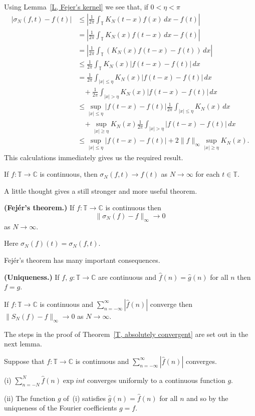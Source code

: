 Using Lemma~\ref{L, Fejer's kernel} we see that, if $0<\eta<\pi$
\begin{align*}
|\sigma_{N}(f,t)-f(t)|&\leq
\left|\frac{1}{2\pi}\int_{\mathbb T}K_{N}(t-x)f(x)\,dx-f(t)\right|\\
&=\left|\frac{1}{2\pi}\int_{\mathbb T}K_{N}(x)f(t-x)\,dx-f(t)\right|\\
&=\left|\frac{1}{2\pi}\int_{\mathbb T}(K_{N}(x)f(t-x)-f(t))\,dx\right|\\
&\leq\frac{1}{2\pi}\int_{\mathbb T}K_{N}(x)|f(t-x)-f(t)|\,dx\\
&=\frac{1}{2\pi}\int_{|x|\leq\eta}K_{N}(x)|f(t-x)-f(t)|\,dx\\
&\ \ \
\ +\frac{1}{2\pi}\int_{|x|>\eta}K_{N}(x)|f(t-x)-f(t)|\,dx\\
&\leq\sup_{|x|\leq\eta}|f(t-x)-f(t)|
\frac{1}{2\pi}\int_{|x|\leq\eta}K_{N}(x)\,dx\\
&\ \ \
\ +\sup_{|x|\geq\eta}K_{N}(x)\frac{1}{2\pi}
\int_{|x|>\eta}|f(t-x)-f(t)|\,dx\\
&\leq\sup_{|x|\leq\eta}|f(t-x)-f(t)|+
2\|f\|_{\infty}\sup_{|x|\geq\eta}K_{N}(x).
\end{align*}
This calculations immediately gives us the required result.
\begin{theorem} If $f:{\mathbb T}\rightarrow{\mathbb C}$
is continuous, then
$\sigma_{N}(f,t)\rightarrow f(t)$ as $N\rightarrow\infty$
for each $t\in{\mathbb T}$.
\end{theorem}
A little thought gives a still stronger and more useful
theorem.
\begin{theorem} {\bf (Fej\'{e}r's theorem.)}
If $f:{\mathbb T}\rightarrow{\mathbb C}$
is continuous then
\[\|\sigma_{N}(f)-f\|_{\infty}\rightarrow 0\]
as $N\rightarrow\infty$.
\end{theorem}
Here $\sigma_{N}(f)(t)=\sigma_{N}(f,t)$.

Fej\'{e}r's theorem has many important consequences.
\begin{theorem} {\bf (Uniqueness.)}
If $f,\,g:{\mathbb T}\rightarrow{\mathbb C}$
are continuous and $\hat{f}(n)=\hat{g}(n)$ for
all $n$ then $f=g$.
\end{theorem}
\begin{theorem}\label{T, absolutely convergent}
If $f:{\mathbb T}\rightarrow{\mathbb C}$
is continuous and
$\sum_{n=-\infty}^{\infty}|\hat{f}(n)|$ converge then
$\|S_{N}(f)-f\|_{\infty}\rightarrow 0$ as $N\rightarrow\infty$.
\end{theorem}
The steps in the proof of Theorem~\ref{T, absolutely convergent}
are set out in the next lemma.
\begin{lemma} Suppose that
$f:{\mathbb T}\rightarrow{\mathbb C}$
is continuous and
$\sum_{n=-\infty}^{\infty}|\hat{f}(n)|$ converges.

(i) $\sum_{n=-N}^{N}\hat{f}(n)\exp int$
converges uniformly to a continuous function $g$.

(ii) The function $g$ of~(i) satisfies $\hat{g}(n)=\hat{f}(n)$
for all $n$ and so by the uniqueness of the Fourier coefficients
$g=f$.
\end{lemma}
